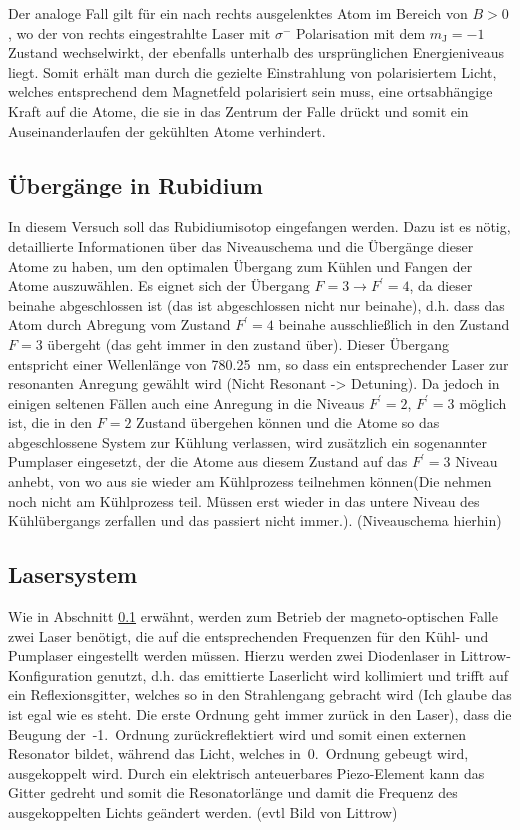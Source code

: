 \documentclass[11pt, a4paper]{article}
\numberwithin{equation}{section}
\newcommand{\korr}[1]{{\color{red}(#1)}}
\begin{document}
Der analoge Fall gilt für ein nach rechts ausgelenktes Atom im Bereich von $B>0$, wo der von rechts eingestrahlte Laser mit $\sigma^-$ Polarisation mit dem $m_\mathrm{J}=-1$ Zustand wechselwirkt, der ebenfalls unterhalb des ursprünglichen Energieniveaus liegt.
Somit erhält man durch die gezielte Einstrahlung von polarisiertem Licht, welches entsprechend dem Magnetfeld polarisiert sein muss, eine ortsabhängige Kraft auf die Atome, die sie in das Zentrum der Falle drückt und somit ein Auseinanderlaufen der gekühlten Atome verhindert.

\subsection{Übergänge in Rubidium}
\label{sec:rb_uebergaenge}

In diesem Versuch soll das Rubidiumisotop  eingefangen werden.
Dazu ist es nötig, detaillierte Informationen über das Niveauschema und die Übergänge dieser Atome zu haben, um den optimalen Übergang zum Kühlen und Fangen der Atome auszuwählen.
Es eignet sich der Übergang $F=3 \rightarrow F^\prime=4$, da dieser beinahe abgeschlossen ist \korr{das ist abgeschlossen nicht nur beinahe}, d.h. dass das Atom durch Abregung vom Zustand $F^\prime=4$ beinahe ausschließlich in den Zustand $F=3$ übergeht \korr{das geht immer in den zustand über}.
Dieser Übergang entspricht einer Wellenlänge von \SI{780.25}{nm}, so dass ein entsprechender Laser zur resonanten Anregung gewählt wird \korr{Nicht Resonant -> Detuning}.
Da jedoch in einigen seltenen Fällen auch eine Anregung in die Niveaus $F^\prime=2$, $F^\prime=3$ möglich ist, die in den $F=2$ Zustand übergehen können und die Atome so das abgeschlossene System zur Kühlung verlassen, wird zusätzlich ein sogenannter Pumplaser eingesetzt, der die Atome aus diesem Zustand auf das $F^\prime=3$ Niveau anhebt, von wo aus sie wieder am Kühlprozess teilnehmen können\korr{Die nehmen noch nicht am Kühlprozess teil. Müssen erst wieder in das untere Niveau des Kühlübergangs zerfallen und das passiert nicht immer.}.
\korr{Niveauschema hierhin} 

\subsection{Lasersystem}

Wie in Abschnitt \ref{sec:rb_uebergaenge} erwähnt, werden zum Betrieb der magneto-optischen Falle zwei Laser benötigt, die auf die entsprechenden Frequenzen für den Kühl- und Pumplaser eingestellt werden müssen.
Hierzu werden zwei Diodenlaser in Littrow-Konfiguration genutzt, d.h. das emittierte Laserlicht wird kollimiert und trifft auf ein Reflexionsgitter, welches so in den Strahlengang gebracht wird \korr{Ich glaube das ist egal wie es steht. Die erste Ordnung geht immer zurück in den Laser}, dass die Beugung der~-1.~Ordnung zurückreflektiert wird und somit einen externen Resonator bildet, während das Licht, welches in~0.~Ordnung gebeugt wird, ausgekoppelt wird.
Durch ein elektrisch anteuerbares Piezo-Element kann das Gitter gedreht und somit die Resonatorlänge und damit die Frequenz des ausgekoppelten Lichts geändert werden.
\korr{evtl Bild von Littrow}
\end{document}
